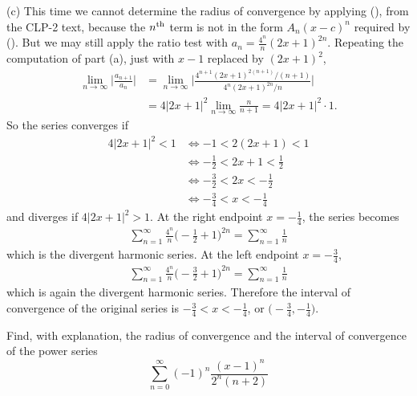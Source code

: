 \begin{solution}
\noindent (c)
This time we cannot determine the radius of convergence by applying (), from the 
CLP-2 text, because the $n^{\rm th}$ term is not in the form $A_n (x-c)^n$ required by 
(). But we may still apply the ratio test with $a_n= \frac{4^n}{n}(2x+1)^{2n}$.
Repeating the computation of part (a), just with $x-1$ replaced by $(2x+1)^2$, 
\begin{align*}
\lim_{n\to\infty} \bigg| \frac{a_{n+1}}{a_n} \bigg|
&= \lim_{n\to\infty} \bigg| \frac{4^{n+1}(2x+1)^{2(n+1)}/(n+1)}{4^n(2x+1)^{2n}/n} \bigg| \\
&= 4|2x+1|^2 \lim_{n\to\infty} \frac{n}{n+1} = 4|2x+1|^2\cdot1.
\end{align*}
So the series converges if
\begin{align*}
4|2x+1|^2<1
&\iff -1<2(2x+1)<1 \\
&\iff -\frac{1}{2}<2x+1<\frac{1}{2} \\
&\iff -\frac{3}{2}<2x<-\frac{1}{2} \\
&\iff -\frac{3}{4}<x<-\frac{1}{4}
\end{align*}
and diverges if $4|2x+1|^2>1$.
At the right endpoint $x=-\frac{1}{4}$, the series becomes
\begin{align*}
\sum_{n=1}^\infty \frac{4^n}{n}\bigg( -\frac{1}{2}+1 \bigg)^{2n}
= \sum_{n=1}^\infty \frac{1}{n}
\end{align*}
which is the divergent harmonic series. At the left endpoint $x=-\frac{3}{4}$,
\begin{align*}
\sum_{n=1}^\infty \frac{4^n}{n}\bigg( -\frac32+1 \bigg)^{2n} = \sum_{n=1}^\infty \frac{1}{n}
\end{align*}
which is again the divergent harmonic series. Therefore the interval of convergence of the
original series is $-\frac{3}{4}< x<-\frac{1}{4}$, or $\big(-\frac{3}{4},-\frac{1}{4}\big)$.
\end{solution}


\begin{Mquestion}[2012A]
Find, with explanation, the radius of convergence and the interval of
convergence of the power series
\begin{equation*}
\sum_{n=0}^\infty (-1)^n\frac{(x-1)^n}{2^n(n+2)}
\end{equation*}
\end{Mquestion}


